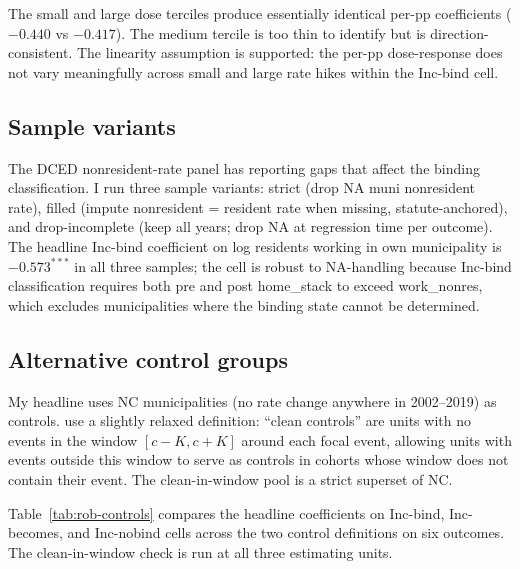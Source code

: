 \documentclass[12pt]{article}
\begin{document}
The small and large dose terciles produce essentially identical per-pp
coefficients ($-0.440$ vs $-0.417$). The medium tercile is too thin
to identify but is direction-consistent. The linearity assumption is
supported: the per-pp dose-response does not vary meaningfully across
small and large rate hikes within the Inc-bind cell.

\subsection{Sample variants}
\label{app:rob-sample}

The DCED nonresident-rate panel has reporting gaps that affect the
binding classification. I run three sample variants: strict
(drop NA muni nonresident rate), filled (impute
nonresident = resident rate when missing, statute-anchored), and
drop-incomplete (keep all years; drop NA at regression time per
outcome). The headline Inc-bind coefficient on log residents working in own municipality is
$-0.573^{***}$ in all three samples; the cell is robust to NA-handling
because Inc-bind classification requires both pre and post home\_stack
to exceed work\_nonres, which excludes municipalities where the binding state
cannot be determined.

\subsection{Alternative control groups}
\label{app:rob-controls}

My headline uses NC municipalities (no rate change anywhere in 2002--2019) as
controls. \citet{cengizEffectMinimumWages2019a} use a slightly relaxed definition:
``clean controls'' are units with no events in the window
$[c - K, c + K]$ around each focal event, allowing units with events
outside this window to serve as controls in cohorts whose
window does not contain their event. The clean-in-window pool is a
strict superset of NC.

Table~\ref{tab:rob-controls} compares the headline coefficients on
Inc-bind, Inc-becomes, and Inc-nobind cells across the two control
definitions on six outcomes. The clean-in-window check is run at all
three estimating units.






\end{document}
